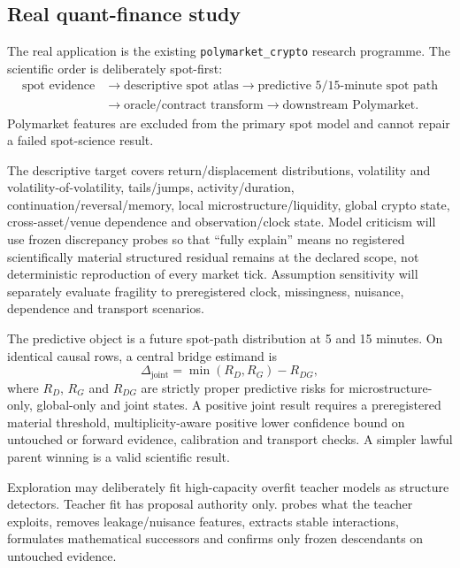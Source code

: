 \subsection{Real quant-finance study}
The real application is the existing \texttt{polymarket\_crypto} research programme. The scientific order is deliberately spot-first:
\begin{equation}
\begin{aligned}
\text{spot evidence}&\to\text{descriptive spot atlas}\to\text{predictive 5/15-minute spot path}\\
&\to\text{oracle/contract transform}\to\text{downstream Polymarket}.
\end{aligned}
\end{equation}
Polymarket features are excluded from the primary spot model and cannot repair a failed spot-science result.

The descriptive target covers return/displacement distributions, volatility and volatility-of-volatility, tails/jumps, activity/duration, continuation/reversal/memory, local microstructure/liquidity, global crypto state, cross-asset/venue dependence and observation/clock state. Model criticism will use frozen discrepancy probes so that ``fully explain'' means no registered scientifically material structured residual remains at the declared scope, not deterministic reproduction of every market tick. Assumption sensitivity will separately evaluate fragility to preregistered clock, missingness, nuisance, dependence and transport scenarios.

The predictive object is a future spot-path distribution at 5 and 15 minutes. On identical causal rows, a central bridge estimand is
\begin{equation}\Delta_{\mathrm{joint}}=\min(R_D,R_G)-R_{DG},\end{equation}
where $R_D$, $R_G$ and $R_{DG}$ are strictly proper predictive risks for microstructure-only, global-only and joint states. A positive joint result requires a preregistered material threshold, multiplicity-aware positive lower confidence bound on untouched or forward evidence, calibration and transport checks. A simpler lawful parent winning is a valid scientific result.

Exploration may deliberately fit high-capacity overfit teacher models as structure detectors. Teacher fit has proposal authority only. \RAKL{} probes what the teacher exploits, removes leakage/nuisance features, extracts stable interactions, formulates mathematical successors and confirms only frozen descendants on untouched evidence.

